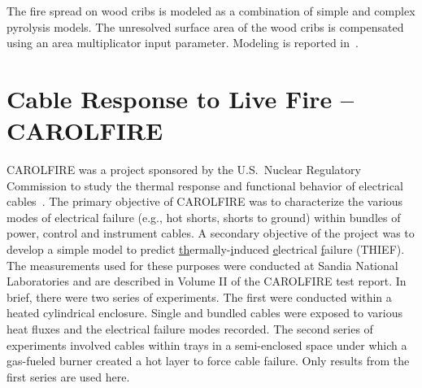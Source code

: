 The fire spread on wood cribs is modeled as a combination of simple and complex pyrolysis models. The unresolved surface area of the wood cribs is compensated using an area multiplicator input parameter. Modeling is reported in~\cite{Janardhan:FSJ2021}.


\section{Cable Response to Live Fire -- CAROLFIRE}
\label{CAROLFIRE_Description}

CAROLFIRE was a project sponsored by the U.S.~Nuclear Regulatory Commission to study the thermal response and functional behavior of electrical cables~\cite{CAROLFIRE}. The primary objective of CAROLFIRE was to characterize the various modes of electrical failure (e.g., hot shorts, shorts to ground) within bundles of power, control and instrument cables. A secondary objective of the project was to develop a simple model to predict \underline{th}ermally-\underline{i}nduced \underline{e}lectrical \underline{f}ailure (THIEF). The measurements used for these purposes were conducted at Sandia National Laboratories and are described in Volume II of the CAROLFIRE test report. In brief, there were two series of experiments. The first were conducted within a heated cylindrical enclosure. Single and bundled cables were exposed to various heat fluxes and the electrical failure modes recorded. The second series of experiments involved cables within trays in a semi-enclosed space under which a gas-fueled burner created a hot layer to force cable failure. Only results from the first series are used here.


